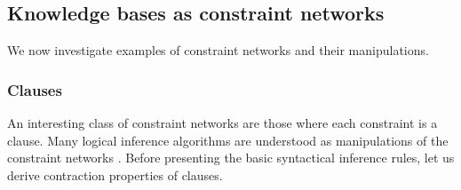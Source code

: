 %
%



\subsection{Knowledge bases as constraint networks}

We now investigate examples of constraint networks and their manipulations.

\subsubsection{Clauses}

An interesting class of constraint networks are those where each constraint is a clause.
Many logical inference algorithms are understood as manipulations of the constraint networks \cite{brachman_knowledge_2014}.
Before presenting the basic syntactical inference rules, let us derive contraction properties of clauses.

